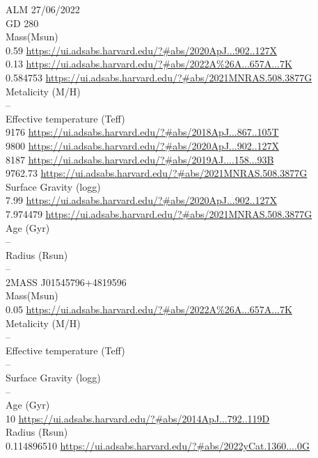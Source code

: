 ALM 27/06/2022\\
GD 280\\
Mass(Msun)\\
0.59 \url{https://ui.adsabs.harvard.edu/?#abs/2020ApJ...902..127X}\\
0.13 \url{https://ui.adsabs.harvard.edu/?#abs/2022A%26A...657A...7K}\\
0.584753 \url{https://ui.adsabs.harvard.edu/?#abs/2021MNRAS.508.3877G}\\
Metalicity (M/H)\\
--\\
Effective temperature (Teff) \\
9176 \url{https://ui.adsabs.harvard.edu/?#abs/2018ApJ...867..105T}\\
9800 \url{https://ui.adsabs.harvard.edu/?#abs/2020ApJ...902..127X}\\
8187 \url{https://ui.adsabs.harvard.edu/?#abs/2019AJ....158...93B}\\
9762.73 \url{https://ui.adsabs.harvard.edu/?#abs/2021MNRAS.508.3877G}\\
Surface Gravity (logg) \\
7.99 \url{https://ui.adsabs.harvard.edu/?#abs/2020ApJ...902..127X}\\
7.974479 \url{https://ui.adsabs.harvard.edu/?#abs/2021MNRAS.508.3877G}\\
Age (Gyr)\\
--\\
Radius (Rsun)\\
--\\
2MASS J01545796+4819596\\
Mass(Msun)\\
0.05 \url{https://ui.adsabs.harvard.edu/?#abs/2022A%26A...657A...7K}\\
Metalicity (M/H)\\
--\\
Effective temperature (Teff) \\
--\\
Surface Gravity (logg) \\
--\\
Age (Gyr)\\
10 \url{https://ui.adsabs.harvard.edu/?#abs/2014ApJ...792..119D}\\
Radius (Rsun)\\
0.114896510	\url{https://ui.adsabs.harvard.edu/?#abs/2022yCat.1360....0G}\\

